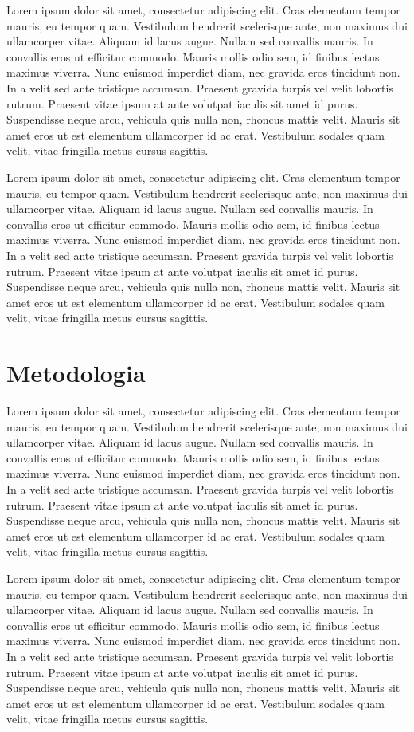 \documentclass[conference]{IEEEtran}
\begin{document}
Lorem ipsum dolor sit amet, consectetur adipiscing elit. Cras elementum tempor mauris, eu tempor quam. Vestibulum hendrerit scelerisque ante, non maximus dui ullamcorper vitae. Aliquam id lacus augue. Nullam sed convallis mauris. In convallis eros ut efficitur commodo. Mauris mollis odio sem, id finibus lectus maximus viverra. Nunc euismod imperdiet diam, nec gravida eros tincidunt non. In a velit sed ante tristique accumsan. Praesent gravida turpis vel velit lobortis rutrum. Praesent vitae ipsum at ante volutpat iaculis sit amet id purus. Suspendisse neque arcu, vehicula quis nulla non, rhoncus mattis velit. Mauris sit amet eros ut est elementum ullamcorper id ac erat. Vestibulum sodales quam velit, vitae fringilla metus cursus sagittis.

Lorem ipsum dolor sit amet, consectetur adipiscing elit. Cras elementum tempor mauris, eu tempor quam. Vestibulum hendrerit scelerisque ante, non maximus dui ullamcorper vitae. Aliquam id lacus augue. Nullam sed convallis mauris. In convallis eros ut efficitur commodo. Mauris mollis odio sem, id finibus lectus maximus viverra. Nunc euismod imperdiet diam, nec gravida eros tincidunt non. In a velit sed ante tristique accumsan. Praesent gravida turpis vel velit lobortis rutrum. Praesent vitae ipsum at ante volutpat iaculis sit amet id purus. Suspendisse neque arcu, vehicula quis nulla non, rhoncus mattis velit. Mauris sit amet eros ut est elementum ullamcorper id ac erat. Vestibulum sodales quam velit, vitae fringilla metus cursus sagittis.

\section{Metodologia}
Lorem ipsum dolor sit amet, consectetur adipiscing elit. Cras elementum tempor mauris, eu tempor quam. Vestibulum hendrerit scelerisque ante, non maximus dui ullamcorper vitae. Aliquam id lacus augue. Nullam sed convallis mauris. In convallis eros ut efficitur commodo. Mauris mollis odio sem, id finibus lectus maximus viverra. Nunc euismod imperdiet diam, nec gravida eros tincidunt non. In a velit sed ante tristique accumsan. Praesent gravida turpis vel velit lobortis rutrum. Praesent vitae ipsum at ante volutpat iaculis sit amet id purus. Suspendisse neque arcu, vehicula quis nulla non, rhoncus mattis velit. Mauris sit amet eros ut est elementum ullamcorper id ac erat. Vestibulum sodales quam velit, vitae fringilla metus cursus sagittis.

Lorem ipsum dolor sit amet, consectetur adipiscing elit. Cras elementum tempor mauris, eu tempor quam. Vestibulum hendrerit scelerisque ante, non maximus dui ullamcorper vitae. Aliquam id lacus augue. Nullam sed convallis mauris. In convallis eros ut efficitur commodo. Mauris mollis odio sem, id finibus lectus maximus viverra. Nunc euismod imperdiet diam, nec gravida eros tincidunt non. In a velit sed ante tristique accumsan. Praesent gravida turpis vel velit lobortis rutrum. Praesent vitae ipsum at ante volutpat iaculis sit amet id purus. Suspendisse neque arcu, vehicula quis nulla non, rhoncus mattis velit. Mauris sit amet eros ut est elementum ullamcorper id ac erat. Vestibulum sodales quam velit, vitae fringilla metus cursus sagittis.
\end{document}
